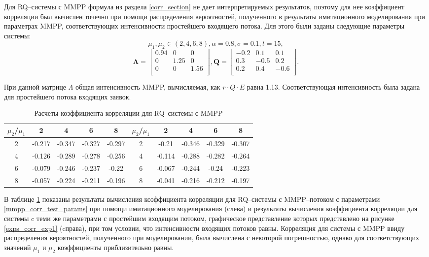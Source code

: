 Для RQ--системы с MMPP формула из раздела \ref{corr_section} не дает интерпретируемых результатов, поэтому для нее коэффициент корреляции был вычислен точечно при помощи распределения вероятностей, полученного в результаты имитационного моделирования при параметрах MMPP, соответствующих интенсивности простейшего входящего потока. Для этого были заданы следующие параметры системы:
 \begin{equation} \label{mmpp_corr_test_params}
\mu_{1},\mu_{2} \in (2,4,6,8), \alpha = 0.8,\sigma = 0.1, t = 15,
\end{equation}
 \begin{equation*}
	\boldsymbol{\Lambda}=\begin{bmatrix}
		0.94 &	0 & 0\\
		0 &	1.25 & 0\\
		0 &	0 & 1.56\\
	\end{bmatrix},
\boldsymbol{Q}=\begin{bmatrix}
	-0.2 &	0.1 & 0.1\\
	0.3 &	-0.5 & 0.2\\
	0.2 & 0.4 & -0.6\\
\end{bmatrix}.
\end{equation*}

При данной матрице $\Lambda$ общая интенсивность MMPP, вычисляемая, как $r\cdot Q\cdot E$ равна 1.13. Соответствующая интенсивность была задана для простейшего потока входящих заявок.

\begin{table}[htb!] 
	\centering
	\caption{Расчеты коэффициента корреляции для RQ--системы с MMPP}
	\label{corr_mmpp_table}
	\begin{tabular}{| c | c | c | c | c || c | c | c | c | c |}
		\hline
		$\mu_{2}$/$\mu_{1}$ & 2 & 4 & 6 & 8 & $\mu_{2}$/$\mu_{1}$ &  2 & 4 & 6 & 8\\ 
		\hline
		2 & -0.217 & -0.347 & -0.327 & -0.297 & 2 & -0.21 & -0.346 & -0.329 & -0.307 \\
		\hline
		4 & -0.126 & -0.289 & -0.278 & -0.256 & 4 & -0.114 & -0.288 & -0.282 & -0.264 \\
		\hline
		6 & -0.079 & -0.246 & -0.237 & -0.22 & 6 & -0.067 & -0.244 & -0.24 & -0.223\\
		\hline
		8 & -0.057 & -0.224 & -0.211 & -0.196 & 8 & -0.041 & -0.216 & -0.212 & -0.197\\
		\hline
	\end{tabular}
\end{table}

В таблице \ref{corr_mmpp_table} показаны результаты вычисления коэффициента корреляции для RQ--системы с MMPP--потоком с параметрами \eqref{mmpp_corr_test_params} при помощи имитационного моделирования (слева) и результаты вычисления коэффициента корреляции для системы c теми же параметрами с простейшим входящим потоком, графическое представление которых представлено на рисунке \ref{exps_corr_exp1} (cправа), при том условии, что интенсивности входящих потоков равны. Корреляция для системы с MMPP ввиду распределения вероятностей, полученного при моделировании, была вычислена с некоторой погрешностью, однако для соответствующих значений $\mu_{1}$ и $\mu_{2}$ коэффициенты приблизительно равны.
\clearpage
